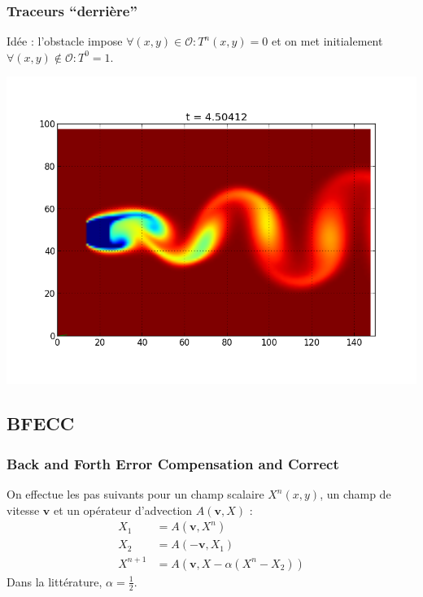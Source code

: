 \documentclass{beamer}
\renewcommand{\O}{\mathcal{O}}
\newcommand{\vect}[1]{\boldsymbol{#1}}
\begin{document}
  \begin{frame}
    \frametitle{Traceurs ``derrière''}
    Idée : l'obstacle impose $\forall (x,y) \in \O: T^n(x,y) = 0$ et on met
    initialement  $\forall (x,y) \not\in \O : T^0 = 1$.
    \begin{center}
      \includegraphics[height=0.6\textheight]{tracer1.png}
    \end{center}
  \end{frame}
  \subsection{BFECC}
  \begin{frame}
    \frametitle{Back and Forth Error Compensation and Correct }
    On effectue les pas suivants pour un champ scalaire $X^n(x,y)$, un
    champ de vitesse $\vect{v}$ et un opérateur d'advection
    $A(\vect{v},X)$ :
    \begin{align}
      X_1 & = A(\vect{v},X^n) \\
      X_2 & = A(-\vect{v},X_1) \\
      X^{n+1} & = A(\vect{v},X - \alpha(X^n - X_2))
    \end{align}
    Dans la littérature, $\alpha = \frac{1}{2}$.
  \end{frame}
\end{document}
